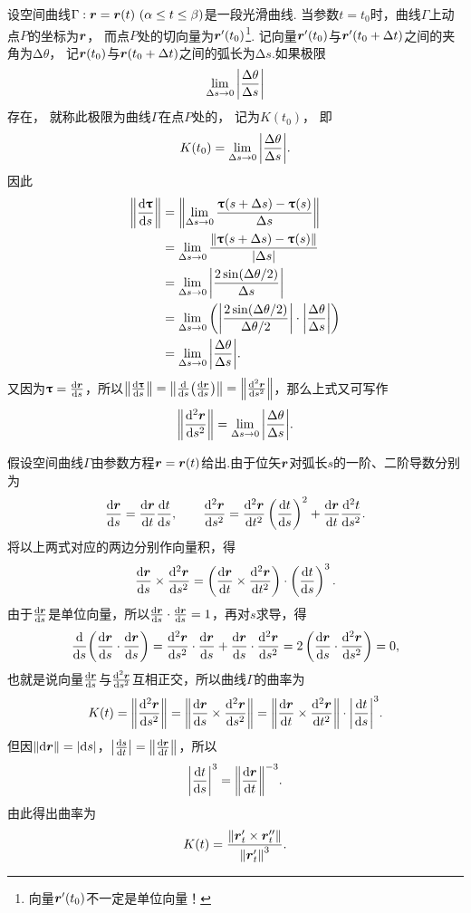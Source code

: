设空间曲线\(\Gamma: \vb{r} = \vb{r}(t)\ (\alpha \leq t \leq \beta)\)是一段光滑曲线.
当参数\(t = t_0\)时，曲线\(\Gamma\)上动点\(P\)的坐标为\(\boldsymbol{r}\)，
而点\(P\)处的切向量为\(\boldsymbol{r}'(t_0)\)\footnote{向量\(\boldsymbol{r}'(t_0)\)不一定是单位向量！}.
记向量\(\boldsymbol{r}'(t_0)\)与\(\boldsymbol{r}'(t_0+\Delta t)\)之间的夹角为\(\increment\theta\)，
记\(\boldsymbol{r}(t_0)\)与\(\boldsymbol{r}(t_0+\Delta t)\)之间的弧长为\(\increment s\).如果极限\[
	\lim_{\Delta s \to 0} \abs{ \frac{\Delta\theta}{\Delta s} }
\]存在，
就称此极限为曲线\(\Gamma\)在点\(P\)处的，
记为\(K(t_0)\)，
即\[
	K(t_0)
	= \lim_{\Delta s \to 0} \abs{ \frac{\Delta\theta}{\Delta s} }.
\]
因此\begin{align*}
	\norm{ \dv{\boldsymbol{\uptau}}{s} }
	&= \norm{
			\lim_{\Delta s \to 0}
				\frac{\boldsymbol{\uptau}(s+\Delta s) - \boldsymbol{\uptau}(s)}{\Delta s}
		} \\
	&= \lim_{\Delta s \to 0}
		\frac{\norm{\boldsymbol{\uptau}(s+\Delta s) - \boldsymbol{\uptau}(s)}}{\abs{\Delta s}} \\
	&= \lim_{\Delta s \to 0}
		\abs{ \frac{2 \sin(\Delta\theta / 2)}{\Delta s} } \\
	&= \lim_{\Delta s \to 0}
		\left(
			\abs{ \frac{2 \sin(\Delta\theta / 2)}{\Delta\theta/2} }
			\cdot \abs{ \frac{\Delta\theta}{\Delta s} }
		\right) \\
	&= \lim_{\Delta s \to 0}
		\abs{ \frac{\Delta\theta}{\Delta s} }.
\end{align*}
又因为\(\boldsymbol{\uptau} = \dv{\boldsymbol{r}}{s}\)，所以\(\norm{ \dv{\boldsymbol{\uptau}}{s} } = \norm{ \dv{s}( \dv{\boldsymbol{r}}{s} ) } = \norm{ \dv[2]{\boldsymbol{r}}{s} }\)，那么上式又可写作\begin{equation}
\norm{ \dv[2]{\boldsymbol{r}}{s} }
= \lim_{\Delta s \to 0} \abs{ \frac{\Delta\theta}{\Delta s} }.
\end{equation}

假设空间曲线\(\Gamma\)由参数方程\(\boldsymbol{r} = \boldsymbol{r}(t)\)给出.由于位矢\(\boldsymbol{r}\)对弧长\(s\)的一阶、二阶导数分别为\[
\dv{\boldsymbol{r}}{s} = \dv{\boldsymbol{r}}{t} \dv{t}{s},
\qquad
\dv[2]{\boldsymbol{r}}{s} = \dv[2]{\boldsymbol{r}}{t} \left(\dv{t}{s}\right)^2 + \dv{\boldsymbol{r}}{t} \dv[2]{t}{s}.
\]将以上两式对应的两边分别作向量积，得\[
\dv{\boldsymbol{r}}{s} \times \dv[2]{\boldsymbol{r}}{s}
= \left(\dv{\boldsymbol{r}}{t} \times \dv[2]{\boldsymbol{r}}{t}\right) \cdot \left(\dv{t}{s}\right)^3.
\]由于\(\dv{\boldsymbol{r}}{s}\)是单位向量，所以\(\dv{\boldsymbol{r}}{s} \cdot \dv{\boldsymbol{r}}{s} = 1\)，再对\(s\)求导，得\[
\dv{s}( \dv{\boldsymbol{r}}{s} \cdot \dv{\boldsymbol{r}}{s} )
= \dv[2]{\boldsymbol{r}}{s} \cdot \dv{\boldsymbol{r}}{s} + \dv{\boldsymbol{r}}{s} \cdot \dv[2]{\boldsymbol{r}}{s}
= 2 \left( \dv{\boldsymbol{r}}{s} \cdot \dv[2]{\boldsymbol{r}}{s} \right)
= 0,
\]也就是说向量\(\dv{\boldsymbol{r}}{s}\)与\(\dv[2]{\boldsymbol{r}}{s}\)互相正交，所以曲线\(\Gamma\)的曲率为\[
K(t) = \norm{ \dv[2]{\boldsymbol{r}}{s} }
= \norm{ \dv{\boldsymbol{r}}{s} \times \dv[2]{\boldsymbol{r}}{s} }
= \norm{ \dv{\boldsymbol{r}}{t} \times \dv[2]{\boldsymbol{r}}{t} } \cdot \abs{ \dv{t}{s} }^3.
\]但因\(\norm{ \dd{\boldsymbol{r}} } = \abs{ \dd{s} }\)，\(\abs{ \dv{s}{t} } = \norm{ \dv{\boldsymbol{r}}{t} }\)，所以\[
\abs{ \dv{t}{s} }^3 = \norm{ \dv{\boldsymbol{r}}{t} }^{-3}.
\]由此得出曲率为\begin{equation}
K(t) = \frac{ \norm{ \boldsymbol{r}'_t \times \boldsymbol{r}''_t } }{ \norm{ \boldsymbol{r}'_t }^3 }.
\end{equation}
